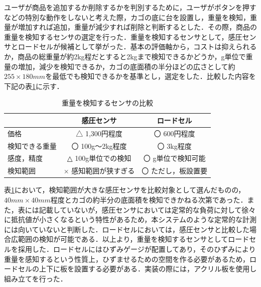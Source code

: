 ユーザが商品を追加するか削除するかを判別するために，ユーザがボタンを押すなどの特別な動作をしないと考えた際，カゴの底に台を設置し，重量を検知，重量が増加すれば追加，重量が減少すれば削除と判断するとした．その際，商品の重量を検知するセンサの選定を行った．重量を検知するセンサとして，感圧センサとロードセルが候補として挙がった．基本の評価軸から，コストは抑えられるか，商品の総重量が約2kg程だとすると2kgまで検知できるかどうか，g単位で重量の増加，減少を検知できるか，カゴの底面積の半分ほどの広さとして約$255\times180mm$を最低でも検知できるかを基準とし，選定をした．比較した内容を下記の表\ref{rodo}に示す．


\begin{table}[htb]
\begin{center}
\caption{重量を検知するセンサの比較}
\begin{tabular}{|l|c|c|} \hline
 & 感圧センサ & ロードセル \\ \hline \hline
価格 & △ 1,300円程度 & 〇 600円程度 \\
検知できる重量 & 〇 100g～2kg程度  & 〇 3kg程度 \\ 
感度，精度 & △ 100g単位での検知 & 〇 g単位で検知可能 \\
検知範囲 & × 感知範囲が狭すぎる & 〇 ただし，板設置要 \\ \hline
\end{tabular}
\label{rodo}
\end{center}
\end{table}


表\ref{rodo}において，検知範囲が大きな感圧センサを比較対象として選んだものの，$40mm\times40mm$程度とカゴの約半分の底面積を検知できかねる次第であった．また，表には記載していないが，感圧センサにおいては定常的な負荷に対して徐々に抵抗値が小さくなるという特性があるため，本システムのような定常的な計測には向いていないと判断した．ロードセルにおいては，感圧センサと比較した場合広範囲の検知が可能である．以上より，重量を検知するセンサとしてロードセルを採用した．ロードセルにはひずみゲージが配置してあり，そのひずみにより重量を感知するという性質上，ひずませるための空間を作る必要があるため，ロードセルの上下に板を設置する必要がある．実装の際には，アクリル板を使用し組み立てを行った．